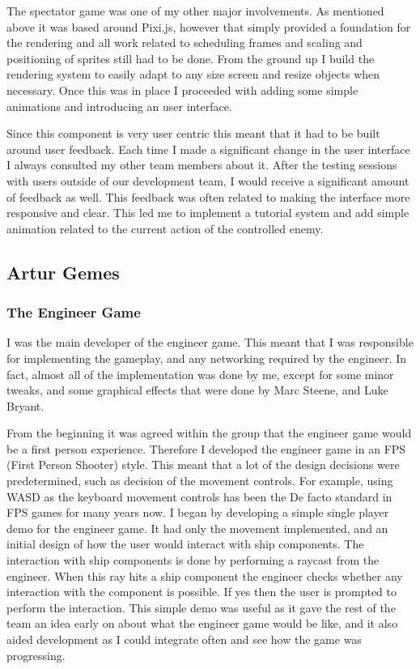 \documentclass[a4paper,11pt]{article}
\begin{document}
The spectator game was one of my other major involvements. As mentioned above it was based around Pixi.js, however that simply provided a foundation for the rendering and all work related to scheduling frames and scaling and positioning of sprites still had to be done. From the ground up I build the rendering system to easily adapt to any size screen and resize objects when necessary. Once this was in place I proceeded with adding some simple animations and introducing an user interface.

Since this component is very user centric this meant that it had to be built around user feedback. Each time I made a significant change in the user interface I always consulted my other team members about it. After the testing sessions with users outside of our development team, I would receive a significant amount of feedback as well. This feedback was often related to making the interface more responsive and clear. This led me to implement a tutorial system and add simple animation related to the current action of the controlled enemy.

\clearpage

\subsection{Artur Gemes}

\subsubsection{The Engineer Game}

I was the main developer of the engineer game. This meant that I was responsible for implementing the gameplay, and any networking required by the engineer. In fact, almost all of the implementation was done by me, except for some minor tweaks, and some graphical effects that were done by Marc Steene, and Luke Bryant.

From the beginning it was agreed within the group that the engineer game would be a first person experience. Therefore I developed the engineer game in an FPS (First Person Shooter) style. This meant that a lot of the design decisions were predetermined, such as decision of the movement controls. For example, using WASD as the keyboard movement controls has been the De facto standard in FPS games for many years now. I began by developing a simple single player demo for the engineer game. It had only the movement implemented, and an initial design of how the user would interact with ship components. The interaction with ship components is done by performing a raycast from the engineer. When this ray hits a ship component the engineer checks whether any interaction with the component is possible. If yes then the user is prompted to perform the interaction. This simple demo was useful as it gave the rest of the team an idea early on about what the engineer game would be like, and it also aided development as I could integrate often and see how the game was progressing.
\end{document}
